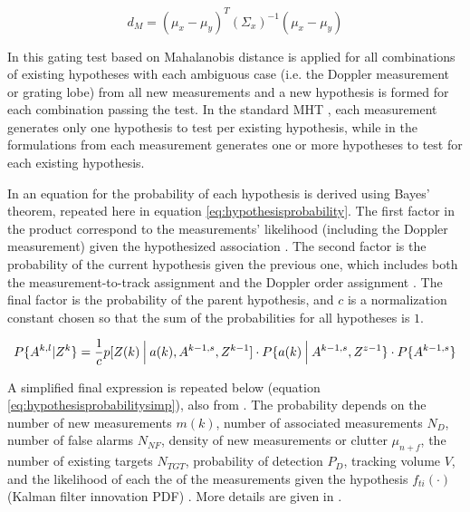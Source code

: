 \documentclass[journal]{IEEEtran}
\newcommand\given[1][]{\:#1\vert\:}
\begin{document}
\begin{dmath} \label{eq:mahalanobis}
    { d_{M} = (\mu_x - \mu_y)^T (\Sigma_x)^{-1} (\mu_x - \mu_y) }
\end{dmath}

In \cite{li2013multitarget,yamada2017multi} this gating test based on Mahalanobis distance is applied for all combinations of existing hypotheses with each ambiguous case (i.e. the Doppler measurement or grating lobe) from all new measurements and a new hypothesis is formed for each combination passing the test. In the standard MHT \cite{kim2015multiple}, each measurement generates only one hypothesis to test per existing hypothesis, while in the formulations from \cite{li2013multitarget,yamada2017multi} each measurement generates one or more hypotheses to test for each existing hypothesis.

In \cite{li2013multitarget} an equation for the probability of each hypothesis is derived using Bayes' theorem, repeated here in equation \ref{eq:hypothesisprobability}. The first factor in the product correspond to the measurements' likelihood (including the Doppler measurement) given the hypothesized association \cite{li2013multitarget}. The second factor is the probability of the current hypothesis given the previous one, which includes both the measurement-to-track assignment and the Doppler order assignment \cite{li2013multitarget}. The final factor is the probability of the parent hypothesis, and $c$ is a normalization constant chosen so that the sum of the probabilities for all hypotheses is $1$.

\begin{dmath*} \label{eq:hypothesisprobability}
    P\{A^{k,l}|Z^{k}\} = \penalty0
    \frac{1}{c} \penalty0
    p[ Z(k) \given[\Big] a(k), A^{k-1,s}, Z^{k-1} ] \penalty0
    \cdot P\{a(k) \given[\Big] A^{k-1,s}, Z^{z-1} \} \penalty0
    \cdot P\{ A^{k-1,s} \}
\end{dmath*}

A simplified final expression is repeated below (equation \ref{eq:hypothesisprobabilitysimp}), also from \cite{li2013multitarget}. The probability depends on the number of new measurements $m(k)$, number of associated measurements $N_D$, number of false alarms $N_{NF}$, density of new measurements or clutter $\mu_{n+f}$, the number of existing targets $N_{TGT}$, probability of detection $P_D$, tracking volume $V$, and the likelihood of each the of the measurements given the hypothesis $f_{ti}(\cdot)$ (Kalman filter innovation PDF) \cite{li2013multitarget}. More details are given in \cite{li2013multitarget}.
\end{document}
